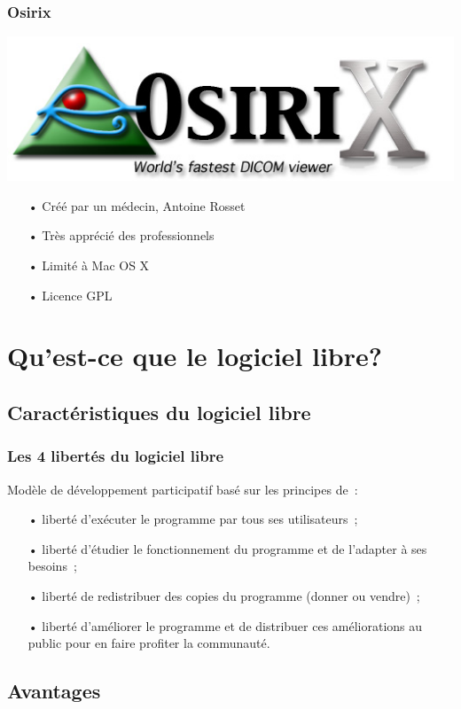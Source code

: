 \documentclass[11pt]{beamer}
\begin{document}
\begin{frame}
\frametitle{Osirix}
\includegraphics[scale=0.17]{Osirix.jpg}
\begin{itemize}[<+->]
\item[•] Créé par un médecin, Antoine Rosset
\item[•] Très apprécié des professionnels
\item[•] Limité à Mac OS X
\item[•] Licence GPL
\end{itemize}
\end{frame}

\section{Qu'est-ce que le logiciel libre?}

\subsection{Caractéristiques du logiciel libre}

\begin{frame}
\frametitle{Les 4 libertés du logiciel libre}
Modèle de développement participatif basé sur les principes de~:
\begin{itemize}[<+->]
\item[•] liberté d'exécuter le programme par tous ses utilisateurs~;
\item[•] liberté d'étudier le fonctionnement du programme et de l'adapter à ses besoins~;
\item[•] liberté de redistribuer des copies du programme (donner ou vendre)~;
\item[•] liberté d'améliorer le programme et de distribuer ces améliorations au public pour en faire profiter la communauté.
\end{itemize}
\end{frame}

\subsection{Avantages}
\end{document}

